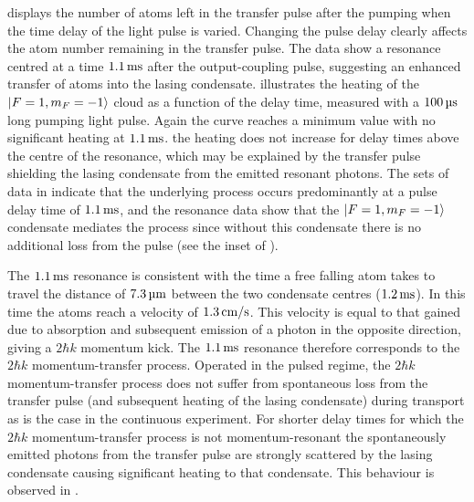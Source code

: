  displays the number of atoms left in the transfer pulse after the pumping when the time delay of the light pulse is varied.  Changing the pulse delay clearly affects the atom number remaining in the transfer pulse.  The data show a resonance centred at a time $\unit[1.1]{ms}$ after the output-coupling pulse, suggesting an enhanced transfer of atoms into the lasing condensate.   illustrates the heating of the ${\left|F=1, m_F=-1\right>}$ cloud as a function of the delay time, measured with a $\unit[100]{\micro s}$ long pumping light pulse.  Again the curve reaches a minimum value with no significant heating at $\unit[1.1]{ms}$.  the heating does not increase for delay times above the centre of the resonance, which may be explained by the transfer pulse shielding the lasing condensate from the emitted resonant photons.  The sets of data in  indicate that the underlying process occurs predominantly at a pulse delay time of $\unit[1.1]{ms}$, and the resonance data show that the ${\left|F=1, m_F=-1\right>}$ condensate mediates the process since without this condensate there is no additional loss from the pulse (see the inset of ).

The $\unit[1.1]{ms}$ resonance is consistent with the time a free falling atom takes to travel the distance of $\unit[7.3]{\micro m}$ between the two condensate centres ($\unit[1.2]{ms}$).  In this time the atoms reach a velocity of $\unit[1.3]{cm/s}$.  This velocity is equal to that gained due to absorption and subsequent emission of a photon in the opposite direction, giving a $2 \hbar k$ momentum kick.  The $\unit[1.1]{ms}$ resonance therefore corresponds to the $2 \hbar k$ momentum-transfer process.  Operated in the pulsed regime, the $2 \hbar k$ momentum-transfer process does not suffer from spontaneous loss from the transfer pulse (and subsequent heating of the lasing condensate) during transport as is the case in the continuous experiment.  For shorter delay times for which the $2 \hbar k$ momentum-transfer process is not momentum-resonant the spontaneously emitted photons from the transfer pulse are strongly scattered by the lasing condensate causing significant heating to that condensate.  This behaviour is observed in .

